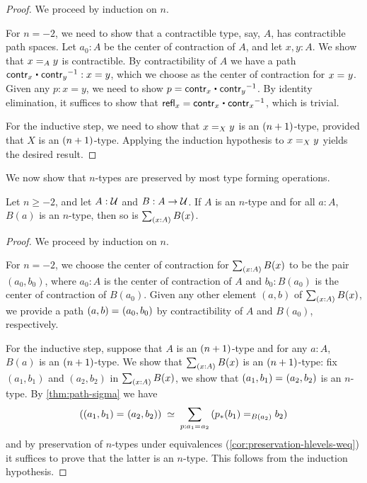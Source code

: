 \begin{proof}
 We proceed by induction on $n$.

 For $n = -2$, we need to show that a contractible type, say, $A$, has contractible path spaces.
       Let $a_0: A$ be the center of contraction of $A$, and let $x, y : A$. We show that $\id[A]{x}{y}$
       is contractible.
       By contractibility of $A$ we have a path $\contr_x \ct \opp{\contr_y} : x = y$, which we choose as
       the center of contraction for $\id{x}{y}$.
       Given any $p : x = y$, we need to show $p = \contr_x \ct \opp{\contr_y}$.
           By identity elimination, it suffices to show that
        $\refl{x} = \contr_x \ct \opp{\contr_x}$, which is trivial.

 For the inductive step, we need to show that $\id[X]{x}{y}$ is an $\nplusone$-type, provided
          that $X$ is an $\nplusone$-type. Applying the induction hypothesis to $\id[X]{x}{y}$
         yields the desired result.
\end{proof}


We now show that $n$-types are preserved by most type forming operations.

\begin{thm}\label{thm:ntypes-sigma}
 Let $n \geq -2$, and let $A : \type$ and $B : A \to \type$.
 If $A$ is an $n$-type and for all $a : A$, $B(a)$ is an $n$-type, then so is $\sm{x : A} B(x)$.
\end{thm}

\begin{proof}
 We proceed by induction on $n$.

 For $n = -2$, we choose the center of contraction for $\sm{x : A} B(x)$ to be the pair
       $(a_0, b_0)$, where $a_0 : A$ is the center of contraction of $A$ and $b_0 : B(a_0)$ is the center of contraction of $B(a_0)$.
       Given any other element $(a,b)$ of $\sm{x : A} B(x)$, we provide a path $\id{(a, b)}{(a_0,b_0)}$
       by contractibility of $A$ and $B(a_0)$, respectively.

 For the inductive step, suppose that $A$ is an $\nplusone$-type and
         for any $a : A$, $B(a)$ is an $\nplusone$-type. We show that $\sm{x : A} B(x)$ is an $\nplusone$-type:
      fix $(a_1, b_1)$ and $(a_2,b_2)$ in $\sm{x : A} B(x)$,
     we show that $\id{(a_1, b_1)}{(a_2,b_2)}$ is an $n$-type.
      By \autoref{thm:path-sigma} we have
      \[ \eqvspaced{(\id{(a_1, b_1)}{(a_2,b_2)})}{\sm{p : \id{a_1}{a_2}} (\id[B(a_2)]{\trans{p}{b_1}}{b_2})} \]
   and by preservation of $n$-types under equivalences (\autoref{cor:preservation-hlevels-weq})
   it suffices to prove that the latter is an $n$-type. This follows from the
   induction hypothesis.
\end{proof}

